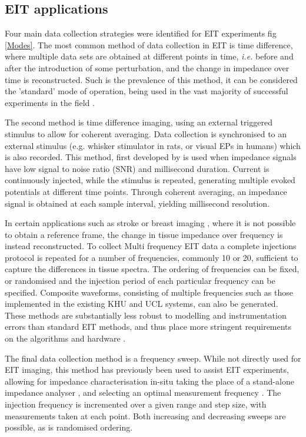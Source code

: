 \subsection{EIT applications}
Four main data collection strategies were identified for EIT experiments fig \ref{Modes}.  The most common method of data collection in EIT is time difference, where multiple data sets are obtained at different points in time, \emph{i.e.} before and after the introduction of some perturbation, and the change in impedance over time is reconstructed. Such is the prevalence of this method, it can be considered the 'standard' mode of operation, being used in the vast majority of successful experiments in the field \cite{bayford2012bioimpedance}.

The second method is time difference imaging, using an external triggered stimulus to allow for coherent averaging. Data collection is synchronised to an external stimulus (e.g. whisker stimulator in rats, or visual EPs in humans) which is also recorded. This method, first developed by \citet{Oh2011} is used when impedance signals have low signal to noise ratio (SNR) and millisecond duration. Current is continuously injected, while the stimulus is repeated, generating multiple evoked potentials at different time points. Through coherent averaging, an impedance signal is obtained at each sample interval, yielding millisecond resolution. 

In certain applications such as stroke \cite{Romsauerova2006} or breast imaging \cite{Halter}, where it is not possible to obtain a reference frame, the change in tissue impedance over frequency is instead reconstructed. To collect Multi frequency EIT data a complete injections protocol is repeated for a number of frequencies, commonly 10 or 20, sufficient to capture the differences in tissue spectra. The ordering of frequencies can be fixed, or randomised and the injection period of each particular frequency can be specified. Composite waveforms, consisting of multiple frequencies such as those implemented in the existing KHU \cite{Hun_Wi_2014} and UCL \cite{McEwan_2006} systems, can also be generated. These methods are substantially less robust to modelling and instrumentation errors than standard EIT methods, and thus place more stringent requirements on the algorithms and hardware \cite{Ahn2011} \cite{Malone2014}.

The final data collection method is a frequency sweep. While not directly used for EIT imaging, this method has previously been used to assist EIT experiments, allowing for impedance characterisation in-situ taking the place of a stand-alone impedance analyser \cite{Gabriel_2009}, and selecting an optimal measurement frequency \cite{VongerichtenASantosGAristovichK2013}. The injection frequency is incremented over a given range and step size, with measurements taken at each point. Both increasing and decreasing sweeps are possible, as is randomised ordering.